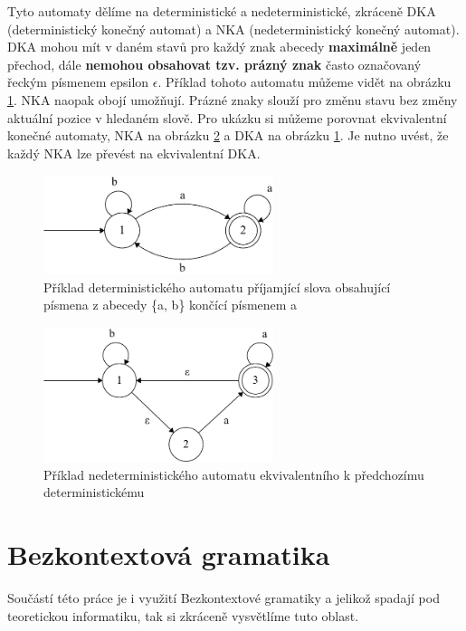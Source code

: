 Tyto automaty dělíme na deterministické a nedeterministické, zkráceně DKA (deterministický konečný automat) a NKA (nedeterministický konečný automat).
DKA mohou mít v daném stavů pro každý znak abecedy \textbf{maximálně} jeden přechod, dále \textbf{nemohou obsahovat tzv. prázný znak} často označovaný řeckým písmenem epsilon $\epsilon$.
Příklad tohoto automatu můžeme vidět na obrázku \ref{fig:DFAex}.
NKA naopak obojí umožňují. 
Prázné znaky slouží pro změnu stavu bez změny aktuální pozice v hledaném slově. 
Pro ukázku si můžeme porovnat ekvivalentní konečné automaty,
NKA na obrázku \ref{fig:NFAex} a DKA na obrázku \ref{fig:DFAex}.
Je nutno uvést, že každý NKA lze převést na ekvivalentní DKA.

\begin{figure}[!h]
	\centering
	\includegraphics[width=0.6\textwidth]{Figures/DFA_example.pdf}
	\caption{Příklad deterministického automatu příjamjící slova obsahující písmena z abecedy \{a, b\} končící písmenem a}
	\label{fig:DFAex}
\end{figure}

\begin{figure}[!h]
	\centering
	\includegraphics[width=0.6\textwidth]{Figures/NFA_example.pdf}
	\caption{Příklad nedeterministického automatu ekvivalentního k předchozímu deterministickému}
	\label{fig:NFAex}
\end{figure}

\section{Bezkontextová gramatika}
Součástí této práce je i využití Bezkontextové gramatiky a jelikož spadají pod teoretickou informatiku, 
tak si zkráceně vysvětlíme tuto oblast.

